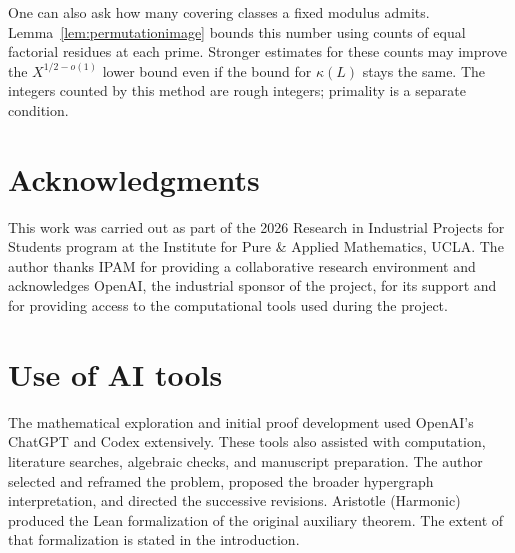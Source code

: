 \documentclass[11pt]{amsart}
\theoremstyle{definition}
\theoremstyle{remark}
\begin{document}
One can also ask how many covering classes a fixed modulus admits.
Lemma~\ref{lem:permutationimage} bounds this number using counts of
equal factorial residues at each prime. Stronger estimates for these
counts may improve the $X^{1/2-o(1)}$ lower bound even if the bound for
$\kappa(L)$ stays the same. The integers counted by this method are
rough integers; primality is a separate condition.

\section*{Acknowledgments}

This work was carried out as part of the 2026 Research in Industrial Projects
for Students program at the Institute for Pure \& Applied Mathematics,
UCLA.  The author thanks IPAM for providing a collaborative research
environment and acknowledges OpenAI, the industrial sponsor of the project,
for its support and for providing access to the computational tools used
during the project.

\section*{Use of AI tools}

The mathematical exploration and initial proof development used OpenAI's
ChatGPT and Codex extensively. These tools also assisted with
computation, literature searches, algebraic checks, and manuscript
preparation. The author selected and reframed the problem, proposed the
broader hypergraph interpretation, and directed the successive revisions.
Aristotle (Harmonic) produced the Lean formalization of the original
auxiliary theorem. The extent of that formalization is stated in the
introduction.
\end{document}
